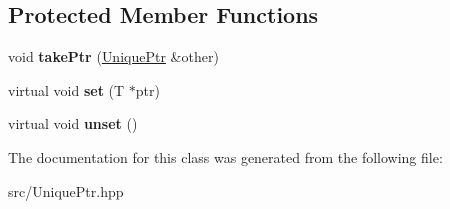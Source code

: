 \subsection*{Protected Member Functions}
\begin{DoxyCompactItemize}
\item 
\mbox{\label{classathome_1_1utility_1_1memory_1_1_unique_ptr_a7844f8563ee8a0c9c7bdf34258cbdfa5}} 
void {\bfseries take\+Ptr} (\mbox{\hyperlink{classathome_1_1utility_1_1memory_1_1_unique_ptr}{Unique\+Ptr}} \&other)
\item 
\mbox{\label{classathome_1_1utility_1_1memory_1_1_unique_ptr_a0b49b8915ce3909d93be956e5fa57e94}} 
virtual void {\bfseries set} (T $\ast$ptr)
\item 
\mbox{\label{classathome_1_1utility_1_1memory_1_1_unique_ptr_a424151ed97aa63eca10e99b8e123978d}} 
virtual void {\bfseries unset} ()
\end{DoxyCompactItemize}


The documentation for this class was generated from the following file\+:\begin{DoxyCompactItemize}
\item 
src/Unique\+Ptr.\+hpp\end{DoxyCompactItemize}
